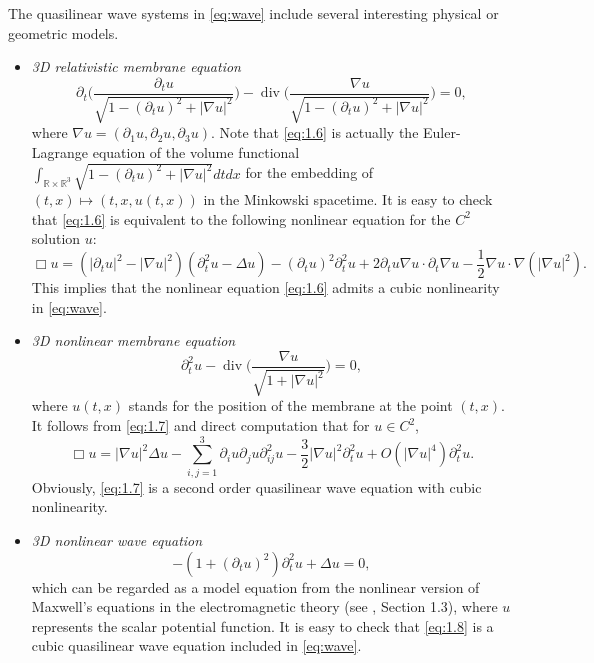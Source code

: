 \documentclass[11pt,twoside]{article}
\def\ds{\displaystyle}
\def\f{\frac}
\def\p{\partial}
\DeclareMathOperator{\Div}{div}
\theoremstyle{plain}
\theoremstyle{definition}
\numberwithin{equation}{section}
\begin{document}
The quasilinear wave systems in \eqref{eq:wave} include several interesting physical or geometric models.
\begin{itemize}
	\item \textit{3D relativistic membrane equation}
	\begin{equation}\label{eq:1.6}
	\partial_t\big( \frac{\partial_t u}{\sqrt{1-(\partial_t u)^2 + |\nabla u|^2}} \big)
	- \Div\big( \frac{\nabla u}{\sqrt{1-(\partial_t u)^2 + |\nabla u|^2}} \big) = 0,
	\end{equation}
	where $\nabla u = (\partial_1 u,\p_2 u,\partial_3 u)$. Note that \eqref{eq:1.6} is actually the Euler-Lagrange equation
	of the volume functional $\int_{\mathbb{R}\times\mathbb{R}^3} \sqrt{1-(\partial_t u)^2 + |\nabla u|^2}dtdx$ for the embedding of
	$(t,x) \mapsto (t,x,u(t,x))$ in the Minkowski spacetime.
	It is easy to check that \eqref{eq:1.6} is equivalent to the following nonlinear equation for the $C^2$ solution $u$:
	\begin{equation*}
	\Box u=(|\partial_t u|^2-|\nabla u|^2)(\partial_t^2 u-\Delta u)-(\partial_t u)^2 \partial_t^2 u
+ 2 \partial_t u\nabla u \cdot  \partial_t\nabla u - \f12\nabla u \cdot \nabla(|\nabla u|^2).
	\end{equation*}
	This implies that the nonlinear equation \eqref{eq:1.6} admits a cubic nonlinearity in \eqref{eq:wave}.
	\item \textit{3D nonlinear membrane equation}
	\begin{equation}\label{eq:1.7}
	\partial_t^2 u - \Div\big(\frac{\nabla u}{\sqrt{1+|\nabla u|^2}}\big) = 0,
	\end{equation}
	where $u(t,x)$ stands for the position of the membrane at the point $(t,x)$. It follows from \eqref{eq:1.7} and direct computation that
	for $u\in C^2$,
\begin{equation*}\label{eq:1.7-1}
\Box u =|\nabla u|^2\Delta u-\ds\sum_{i,j=1}^3\p_iu\p_ju\p_{ij}^2u-\f{3}{2}|\nabla u|^2\p_t^2u+O(|\nabla u|^4)\p_t^2u.
\end{equation*}
Obviously, \eqref{eq:1.7} is a second order quasilinear wave equation with cubic nonlinearity.

\item \textit{3D nonlinear wave equation}
\begin{equation}\label{eq:1.8}
-\left(1+(\partial_t u)^2\right)\partial_t^2 u + \Delta u = 0,
\end{equation}
which can be regarded as a model equation from the nonlinear version of
Maxwell's equations in the electromagnetic theory (see \cite{MiaoYu}, Section 1.3), where $u$ represents the scalar potential
function. It is easy to check that \eqref{eq:1.8} is a cubic quasilinear wave equation included in \eqref{eq:wave}.


\end{itemize}
\end{document}

